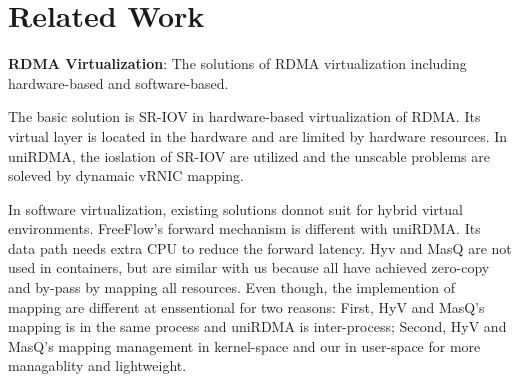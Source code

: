 \section{Related Work}

\textbf{RDMA Virtualization}: The solutions of RDMA virtualization including hardware-based and software-based.

The basic solution is SR-IOV in hardware-based virtualization of RDMA. Its virtual layer is located in the hardware and are limited by hardware resources. In uniRDMA, the ioslation of SR-IOV are utilized and the unscable problems are soleved by dynamaic vRNIC mapping. 

In software virtualization, existing solutions donnot suit for hybrid virtual environments. FreeFlow's forward mechanism is different with uniRDMA. Its data path needs extra CPU to reduce the forward latency. Hyv and MasQ are not used in containers, but are similar with us because all have achieved zero-copy and by-pass by mapping all resources. Even though, the implemention of mapping are different at enssentional for two reasons: First, HyV and MasQ's mapping is in the same process and uniRDMA is inter-process; Second, HyV and MasQ's mapping management in kernel-space and our in user-space for more managablity and lightweight.

